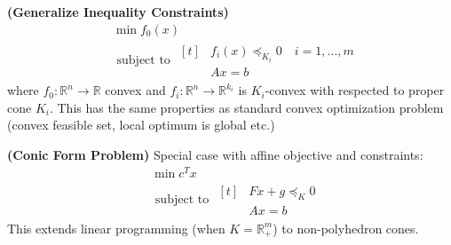 \begin{definition}{\textbf{(Generalize Inequality Constraints)}}
    \begin{equation*}
    \begin{aligned}
        &\min f_0(x) \\
        &\text{ subject to } \begin{aligned}[t]
            &f_i(x)\preceq_{K_i}0 \quad i = 1,\dots,m \\
            &Ax = b
        \end{aligned}
    \end{aligned}
    \end{equation*}
    where $f_0:\mathbb{R}^n\rightarrow \mathbb{R}$ convex and $f_i:\mathbb{R}^n\rightarrow \mathbb{R}^{k_i}$ is $K_i$-convex with respected to proper cone $K_i$. This has the same properties as standard convex optimization problem (convex feasible set, local optimum is global etc.)
\end{definition}

\begin{definition}{\textbf{(Conic Form Problem)}}
    Special case with affine objective and constraints:
    \begin{equation*}
    \begin{aligned}
        &\min c^Tx \\
        &\text{ subject to } \begin{aligned}[t]
            &Fx+g\preceq_K0 \\
            &Ax=b
        \end{aligned}
    \end{aligned}
    \end{equation*}
    This extends linear programming (when $K=\mathbb{R}^m_+$) to non-polyhedron cones.
\end{definition}

